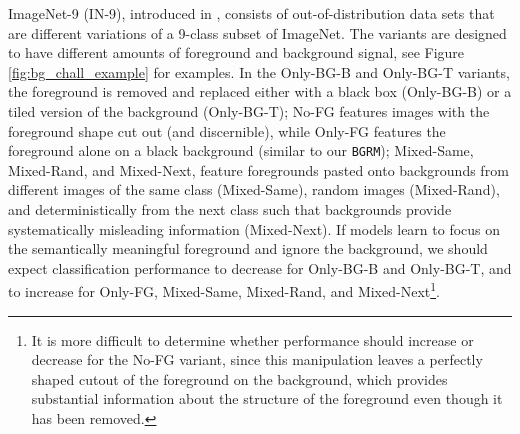 \documentclass[twoside,11pt]{article}
\newcommand{\bgrm}{\texttt{BG\textunderscore RM}}
\begin{document}
ImageNet-9 (IN-9), introduced in \citet{xiao2020noise}, consists of out-of-distribution data sets that are different variations of a 9-class subset of ImageNet. The variants are designed to have different amounts of foreground and background signal, see Figure \ref{fig:bg_chall_example} for examples. In the Only-BG-B and Only-BG-T variants, the foreground is removed and replaced either with a black box (Only-BG-B) or a tiled version of the background (Only-BG-T); No-FG features images with the foreground shape cut out (and discernible), while Only-FG features the foreground alone on a black background (similar to our \bgrm); Mixed-Same, Mixed-Rand, and Mixed-Next, feature foregrounds pasted onto backgrounds from different images of the same class (Mixed-Same), random images (Mixed-Rand), and deterministically from the next class such that backgrounds provide systematically misleading information (Mixed-Next). If models learn to focus on the semantically meaningful foreground and ignore the background, we should expect classification performance to decrease for Only-BG-B and Only-BG-T, and to increase for Only-FG, Mixed-Same, Mixed-Rand, and Mixed-Next\footnote{It is more difficult to determine whether performance should increase or decrease for the No-FG variant, since this manipulation leaves a perfectly shaped cutout of the foreground on the background, which provides substantial information about the structure of the foreground even though it has been removed.}. 
\end{document}
